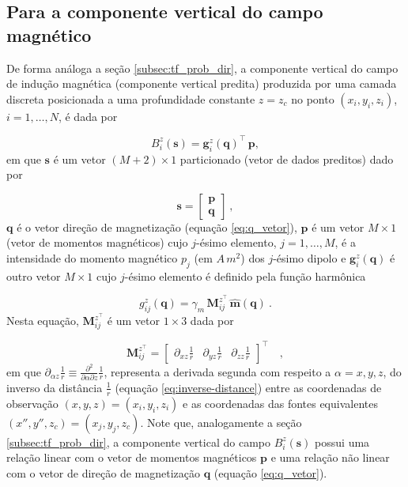 \subsection{Para a componente vertical do campo magnético}
\label{subsec:bz_prob_dir}

De forma análoga a seção \ref{subsec:tf_prob_dir}, a componente vertical do campo de indução magnética (componente vertical predita) produzida por uma camada discreta posicionada a uma profundidade constante $z=z_c$ no ponto $(x_i,y_i,z_i)$, $i=1,\dots,N$, é dada por 

\begin{equation}
B_{i}^{z} (\mathbf{s})  = \mathbf{g}_{i}^{z}(\mathbf{q})^{\top} \, \mathbf{p},
\label{eq:pred_data_ith-z}
\end{equation}
em que $\mathbf{s}$ é um vetor $(M + 2) \times 1$ particionado (vetor de dados preditos) dado por 

\begin{equation}
      \mathbf{s} = \begin{bmatrix}
		\mathbf{p} \\
		\mathbf{q}
	\end{bmatrix} \: ,
	\label{eq:parameter-vector-z}
\end{equation}
$\mathbf{q}$ é o vetor direção de magnetização (equação \ref{eq:q_vetor}), $\mathbf{p}$ é um vetor $M \times 1$ (vetor de momentos magnéticos) cujo $j$-ésimo elemento, $j=1,\dots,M$, é a intensidade do momento magnético $p_{j}$ (em $A \, m^{2}$) dos $j$-ésimo dipolo e $\mathbf{g}_{i}^{z} (\mathbf{q})$ é outro vetor $M \times 1$ cujo $j$-ésimo elemento é definido pela função harmônica 

\begin{equation}
g_{ij}^{z}(\mathbf{q})  = \gamma_m \, \mathbf{M}_{ij}^{z^\top} \, \hat{\mathbf{m}}(\mathbf{q}) \: .
\label{eq:g_ij-z}
\end{equation}
Nesta equação, $\mathbf{M}_{ij}^{z^\top}$ é um vetor $1 \times 3$ dada por 

\begin{equation}
\mathbf{M}_{ij}^{z^\top} = \begin{bmatrix}
\partial_{xz} \frac{1}{r} & 
\partial_{yz} \frac{1}{r} &
\partial_{zz} \frac{1}{r}
\end{bmatrix}^\top \quad ,
\label{eq:Mij-matrix-z}
\end{equation}
em que $\partial_{\alpha z} \frac{1}{r} \equiv \frac{\partial^{2}}{\partial \alpha \partial z} \frac{1}{r}$, representa a derivada segunda com respeito a $\alpha = x, y, z$, do inverso da distância $\frac{1}{r}$ (equação \ref{eq:inverse-distance}) entre as coordenadas de observação $(x, y, z) = (x_{i}, y_{i}, z_{i})$ e as coordenadas das fontes equivalentes $(x'', y'', z_{c}) = (x_{j}, y_{j}, z_{c})$. Note que, analogamente a seção \ref{subsec:tf_prob_dir}, a componente vertical do campo $B_{i}^{z}(\mathbf{s})$ possui uma relação linear com o vetor de momentos magnéticos $\mathbf{p}$ e uma relação não linear com o vetor de direção de magnetização $\mathbf{q}$ (equação \ref{eq:q_vetor}).


